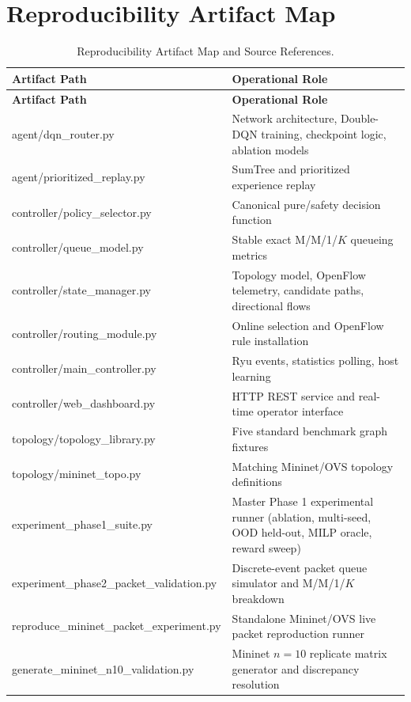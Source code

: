 \documentclass[12pt,a4paper,oneside]{report}
\begin{document}
\chapter{Reproducibility Artifact Map}
\label{app:artifacts}
\begin{longtable}{>{\raggedright\arraybackslash\ttfamily\footnotesize}p{76mm}>{\raggedright\arraybackslash\small}p{68mm}}
\caption{Reproducibility Artifact Map and Source References.}\label{tab:app_artifacts}\\
\toprule
\textrm{\textbf{Artifact Path}} & \textbf{Operational Role}\\
\midrule
\endfirsthead
\toprule
\textrm{\textbf{Artifact Path}} & \textbf{Operational Role}\\
\midrule
\endhead
agent/dqn\_router.py & Network architecture, Double-DQN training, checkpoint logic, ablation models\\
agent/prioritized\_replay.py & SumTree and prioritized experience replay\\
controller/policy\_selector.py & Canonical pure/safety decision function\\
controller/queue\_model.py & Stable exact M/M/1/$K$ queueing metrics\\
controller/state\_manager.py & Topology model, OpenFlow telemetry, candidate paths, directional flows\\
controller/routing\_module.py & Online selection and OpenFlow rule installation\\
controller/main\_controller.py & Ryu events, statistics polling, host learning\\
controller/web\_dashboard.py & HTTP REST service and real-time operator interface\\
topology/topology\_library.py & Five standard benchmark graph fixtures\\
topology/mininet\_topo.py & Matching Mininet/OVS topology definitions\\
experiment\_phase1\_suite.py & Master Phase 1 experimental runner (ablation, multi-seed, OOD held-out, MILP oracle, reward sweep)\\
experiment\_phase2\_packet\_validation.py & Discrete-event packet queue simulator and M/M/1/$K$ breakdown\\
reproduce\_mininet\_packet\_experiment.py & Standalone Mininet/OVS live packet reproduction runner\\
generate\_mininet\_n10\_validation.py & Mininet $n=10$ replicate matrix generator and discrepancy resolution\\

\end{longtable}
\end{document}
